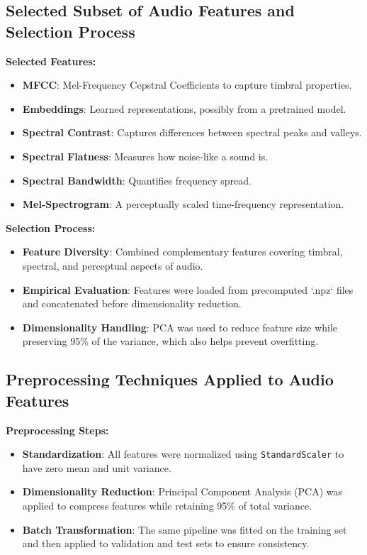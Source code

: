 \documentclass{article}
\begin{document}
\subsection{Selected Subset of Audio Features and Selection Process}

\textbf{Selected Features:}
\begin{itemize}
    \item \textbf{MFCC}: Mel-Frequency Cepstral Coefficients to capture timbral properties.
    \item \textbf{Embeddings}: Learned representations, possibly from a pretrained model.
    \item \textbf{Spectral Contrast}: Captures differences between spectral peaks and valleys.
    \item \textbf{Spectral Flatness}: Measures how noise-like a sound is.
    \item \textbf{Spectral Bandwidth}: Quantifies frequency spread.
    \item \textbf{Mel-Spectrogram}: A perceptually scaled time-frequency representation.
\end{itemize}

\textbf{Selection Process:}
\begin{itemize}
    \item \textbf{Feature Diversity}: Combined complementary features covering timbral, spectral, and perceptual aspects of audio.
    \item \textbf{Empirical Evaluation}: Features were loaded from precomputed `.npz` files and concatenated before dimensionality reduction.
    \item \textbf{Dimensionality Handling}: PCA was used to reduce feature size while preserving 95\% of the variance, which also helps prevent overfitting.
\end{itemize}

\subsection{Preprocessing Techniques Applied to Audio Features}

\textbf{Preprocessing Steps:}
\begin{itemize}
    \item \textbf{Standardization}: All features were normalized using \texttt{StandardScaler} to have zero mean and unit variance.
    \item \textbf{Dimensionality Reduction}: Principal Component Analysis (PCA) was applied to compress features while retaining 95\% of total variance.
    \item \textbf{Batch Transformation}: The same pipeline was fitted on the training set and then applied to validation and test sets to ensure consistency.
\end{itemize}
\end{document}
